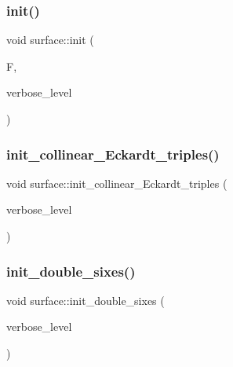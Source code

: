 \mbox{\label{classsurface_a90570b0ca6ab02988159f2c40cb27308}} 
\subsubsection{\texorpdfstring{init()}{init()}}
{\footnotesize\ttfamily void surface\+::init (\begin{DoxyParamCaption}\item[{\mbox{\hyperlink{classfinite__field}{finite\+\_\+field}} $\ast$}]{F,  }\item[{\mbox{\hyperlink{galois_8h_a09fddde158a3a20bd2dcadb609de11dc}{I\+NT}}}]{verbose\+\_\+level }\end{DoxyParamCaption})}

\mbox{\label{classsurface_a7b53d7cad5ba4901e57cac31a364ac47}} 
\subsubsection{\texorpdfstring{init\+\_\+collinear\+\_\+\+Eckardt\+\_\+triples()}{init\_collinear\_Eckardt\_triples()}}
{\footnotesize\ttfamily void surface\+::init\+\_\+collinear\+\_\+\+Eckardt\+\_\+triples (\begin{DoxyParamCaption}\item[{\mbox{\hyperlink{galois_8h_a09fddde158a3a20bd2dcadb609de11dc}{I\+NT}}}]{verbose\+\_\+level }\end{DoxyParamCaption})}

\mbox{\label{classsurface_ae0c2231c8e8e070224d8f56bf6dbad80}} 
\subsubsection{\texorpdfstring{init\+\_\+double\+\_\+sixes()}{init\_double\_sixes()}}
{\footnotesize\ttfamily void surface\+::init\+\_\+double\+\_\+sixes (\begin{DoxyParamCaption}\item[{\mbox{\hyperlink{galois_8h_a09fddde158a3a20bd2dcadb609de11dc}{I\+NT}}}]{verbose\+\_\+level }\end{DoxyParamCaption})}

